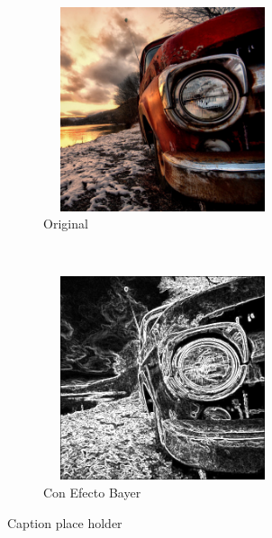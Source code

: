 \begin{figure}[H]
    \centering
    \begin{subfigure}[H]{0.5\textwidth}
        \centering
        \includegraphics[width=7cm, height=6cm]{images/car.png}
        \caption{Original}
    \end{subfigure}%
    ~ 
    \begin{subfigure}[H]{0.5\textwidth}
        \centering
        \includegraphics[width=7cm, height=6cm]{images/img_edgeSobel.png}
        \caption{Con Efecto Bayer}
    \end{subfigure}
    \caption{Caption place holder}
\end{figure} 


